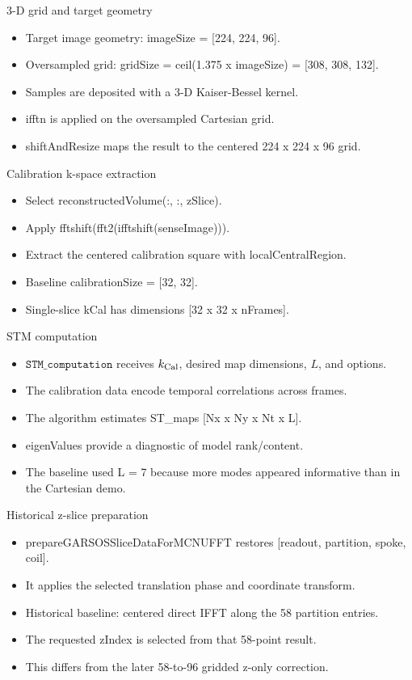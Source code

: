 \documentclass[aspectratio=169,professionalfonts]{beamer}
\begin{document}
\begin{frame}{3-D grid and target geometry}
\begin{itemize}
\item Target image geometry: imageSize = [224, 224, 96].
\item Oversampled grid: gridSize = ceil(1.375 x imageSize) = [308, 308, 132].
\item Samples are deposited with a 3-D Kaiser-Bessel kernel.
\item ifftn is applied on the oversampled Cartesian grid.
\item shiftAndResize maps the result to the centered 224 x 224 x 96 grid.
\end{itemize}
\end{frame}
\begin{frame}{Calibration k-space extraction}
\begin{itemize}
\item Select reconstructedVolume(:, :, zSlice).
\item Apply fftshift(fft2(ifftshift(senseImage))).
\item Extract the centered calibration square with localCentralRegion.
\item Baseline calibrationSize = [32, 32].
\item Single-slice kCal has dimensions [32 x 32 x nFrames].
\end{itemize}
\end{frame}
\begin{frame}{STM computation}
\begin{itemize}
\item $\texttt{STM\_computation}$ receives $k_{\rm Cal}$, desired map dimensions, $L$, and options.
\item The calibration data encode temporal correlations across frames.
\item The algorithm estimates ST\_maps [Nx x Ny x Nt x L].
\item eigenValues provide a diagnostic of model rank/content.
\item The baseline used L = 7 because more modes appeared informative than in the Cartesian demo.
\end{itemize}
\end{frame}
\begin{frame}{Historical z-slice preparation}
\begin{itemize}
\item prepareGARSOSSliceDataForMCNUFFT restores [readout, partition, spoke, coil].
\item It applies the selected translation phase and coordinate transform.
\item Historical baseline: centered direct IFFT along the 58 partition entries.
\item The requested zIndex is selected from that 58-point result.
\item This differs from the later 58-to-96 gridded z-only correction.
\end{itemize}
\end{frame}
\end{document}
